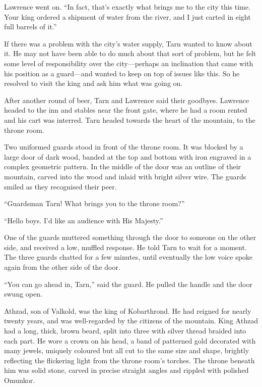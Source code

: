 Lawrence went on.  ``In fact, that's exactly what brings me to the city this time.  Your king ordered a shipment of water from the river, and I just carted in eight full barrels of it.''

If there was a problem with the city's water supply, Tarn wanted to know about it.  He may not have been able to do much about that sort of problem, but he felt some level of responsibility over the city---perhaps an inclination that came with his position as a guard---and wanted to keep on top of issues like this.  So he resolved to visit the king and ask him what was going on.

After another round of beer, Tarn and Lawrence said their goodbyes. Lawrence headed to the inn and stables near the front gate, where he had a room rented and his cart was interred.  Tarn headed towards the heart of the mountain, to the throne room.

Two uniformed guards stood in front of the throne room.  It was blocked by a large door of dark wood, banded at the top and bottom with iron engraved in a complex geometric pattern.  In the middle of the door was an outline of their mountain, carved into the wood and inlaid with bright silver wire.  The guards smiled as they recognised their peer.

``Guardsman Tarn!  What brings you to the throne room?''

``Hello boys.  I'd like an audience with His Majesty.''

One of the guards muttered something through the door to someone on the other side, and received a low, muffled response.  He told Tarn to wait for a moment.  The three guards chatted for a few minutes, until eventually the low voice spoke again from the other side of the door.

``You can go ahead in, Tarn,'' said the guard.  He pulled the handle and the door swung open.

Athzad, son of Valkold, was the king of Kobarthrond.  He had reigned for nearly twenty years, and was well-regarded by the citizens of the mountain.  King Athzad had a long, thick, brown beard, split into three with silver thread braided into each part.  He wore a crown on his head, a band of patterned gold decorated with many jewels, uniquely coloured but all cut to the same size and shape, brightly reflecting the flickering light from the throne room's torches.  The throne beneath him was solid stone, carved in precise straight angles and rippled with polished Omunkor.

